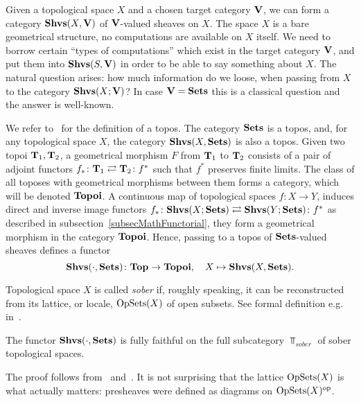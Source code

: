 Given a topological space $X$ and a chosen target category $\mathbf{V}$, we can form a category $\mathbf{Shvs}(X,\mathbf{V})$ of $\mathbf{V}$-valued sheaves on $X$. The space $X$ is a bare geometrical structure, no computations are available on $X$ itself. We need to borrow certain ``types of computations'' which exist in the target category $\mathbf{V}$, and put them into $\mathbf{Shvs}(S,\mathbf{V})$ in order to be able to say something about $X$. The natural question arises: how much information do we loose, when passing from $X$ to the category $\mathbf{Shvs}(X;\mathbf{V})$? In case $\mathbf{V}=\mathbf{Sets}$ this is a classical question and the answer is well-known.

\begin{con}\label{conToposOfSheaves}
We refer to~\cite{MacLaneMoerdijk} for the definition of a topos. The category $\mathbf{Sets}$ is a topos, and, for any topological space $X$, the category $\mathbf{Shvs}(X,\mathbf{Sets})$ is also a topos. Given two topoi $\mathbf{T}_1,\mathbf{T}_2$, a geometrical morphism $F$ from $\mathbf{T}_1$ to $\mathbf{T}_2$ consists of a pair of adjoint functors $f_*\colon \mathbf{T}_1\rightleftarrows \mathbf{T}_2\colon f^*$ such that $f^*$ preserves finite limits. The class of all toposes with geometrical morphisms between them forms a category, which will be denoted $\mathbf{Topoi}$. A continuous map of topological spaces $f\colon X\to Y$, induces direct and inverse image functors $f_*\colon \mathbf{Shvs}(X;\mathbf{Sets})\rightleftarrows\mathbf{Shvs}(Y;\mathbf{Sets})\colon f^*$ as described in subsection~\ref{subsecMathFunctorial}, they form a geometrical morphism in the category $\mathbf{Topoi}$. Hence, passing to a topos of $\mathbf{Sets}$-valued sheaves defines a functor
\begin{equation}\label{eqSpaceToTopos}
\mathbf{Shvs}(\cdot,\mathbf{Sets})\colon \mathbf{Top}\to \mathbf{Topoi},\quad X\mapsto \mathbf{Shvs}(X,\mathbf{Sets}).
\end{equation}
\end{con}

Topological space $X$ is called \emph{sober} if, roughly speaking, it can be reconstructed from its lattice, or locale, $\operatorname{OpSets}(X)$ of open subsets. See formal definition e.g. in~\cite[p.477]{MacLaneMoerdijk}.

\begin{prop}\label{propTopoiFullyFaithful}
The functor $\mathbf{Shvs}(\cdot,\mathbf{Sets})$ is fully faithful on the full subcategory $\Top_{sober}$ of sober topological spaces.
\end{prop}

The proof follows from~\cite[Cor.4,p.481]{MacLaneMoerdijk} and~\cite[Prop.2, p.491]{MacLaneMoerdijk}. It is not surprising that the lattice $\operatorname{OpSets}(X)$ is what actually matters: presheaves were defined as diagrams on $\operatorname{OpSets}(X)^{\operatorname{op}}$.

